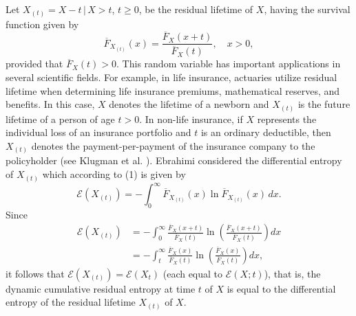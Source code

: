 \documentclass[11pt]{article}
\begin{document}
Let $X_{(t)}=X-t\,|\,X>t$, $t\geq 0$, be the residual lifetime of $X$, having the survival function given by  
$$ \textstyle \overline{F}_{X_{(t)}} (x)=\frac{\overline{F}_X (x+t)}{\overline{F}_X (t)}, \quad x>0,
$$
provided that $\overline{F}_X(t)>0$. This random variable has important applications in several scientific fields. For example, in life insurance, actuaries utilize residual lifetime when determining life insurance premiums, mathematical reserves, and benefits. In this case, $X$ denotes the lifetime of a newborn and $X_{(t)}$ is the future lifetime of a person of age $t>0$. In non-life insurance, if $X$ represents the individual loss of an insurance portfolio and $t$ is an ordinary deductible, then $X_{(t)}$ denotes the payment-per-payment of the insurance company to the policyholder (see Klugman  et al. \cite{Klugman2019}). Ebrahimi \cite{Ebrahimi1996a} considered the differential entropy of $X_{(t)}$ which according to (1) is given by  
$$ \textstyle \mathcal{E}(X_{(t)})=-\int_0^\infty \overline{F}_{X_{(t)}}(x)\ln \overline{F}_{X_{(t)}}(x)\,dx.
$$
Since
\begin{align*}
	\mathcal{E}(X_{(t)}) &= \textstyle -\int_0^\infty \frac{\overline{F}_X(x+t)}{\overline{F}_X(t)} \ln \left(\frac{\overline{F}_X(x+t)}{\overline{F}_X(t)}\right) dx \\
	&= \textstyle -\int_t^\infty \frac{\overline{F}_X(x)}{\overline{F}_X(t)} \ln \left(\frac{\overline{F}_X(x)}{\overline{F}_X(t)}\right) dx,
\end{align*}
it follows that $\mathcal{E}(X_{(t)})=\mathcal{E}(X_t)$ (each equal to $\mathcal{E}(X;t)$), that is, the dynamic cumulative residual entropy at time $t$ of $X$ is equal to the differential entropy of the residual lifetime $X_{(t)}$ of $X$.  
\end{document}
